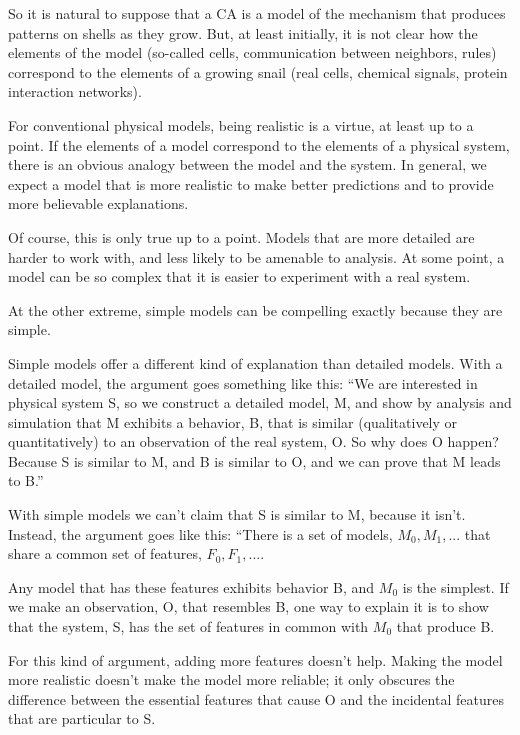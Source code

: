 \documentclass[10pt]{book}
\begin{document}
So it is natural to suppose that a CA is a model of the mechanism that
produces patterns on shells as they grow.  But, at least initially, it
is not clear how the elements of the model (so-called cells,
communication between neighbors, rules) correspond to the elements of
a growing snail (real cells, chemical signals, protein interaction
networks).

For conventional physical models, being realistic is a virtue, at
least up to a point.  If the elements of a model correspond to the
elements of a physical system, there is an obvious analogy between the
model and the system.  In general, we expect a model that is more
realistic to make better predictions and to provide more believable
explanations.

Of course, this is only true up to a point.  Models that are
more detailed are harder to work with, and less likely to be
amenable to analysis.  At some point, a model can be so complex
that it is easier to experiment with a real system.

At the other extreme, simple models can be compelling
exactly because they are simple.  

Simple models offer a different kind of explanation than detailed
models.  With a detailed model, the argument goes something
like this: ``We are interested in physical system S, so we
construct a detailed model, M, and show by analysis and simulation
that M exhibits a behavior, B, that is similar (qualitatively
or quantitatively) to an observation of the real system, O.
So why does O happen?  Because S is similar to M, and
B is similar to O, and we can prove that M leads to B.''

With simple models we can't claim that S is similar to M, because it
isn't.  Instead, the argument goes like this: ``There is a set of
models, ${M_0, M_1, ...}$ that share a common set of features, ${F_0,
  F_1, ...}$.  

Any model that has these features exhibits behavior B, and $M_0$ is
the simplest.  If we make an observation, O, that resembles B, one way
to explain it is to show that the system, S, has the set of
features in common with $M_0$ that produce B.

For this kind of argument, adding more features doesn't help.  Making
the model more realistic doesn't make the model more reliable; it only
obscures the difference between the essential features that cause O
and the incidental features that are particular to S.
\end{document}
